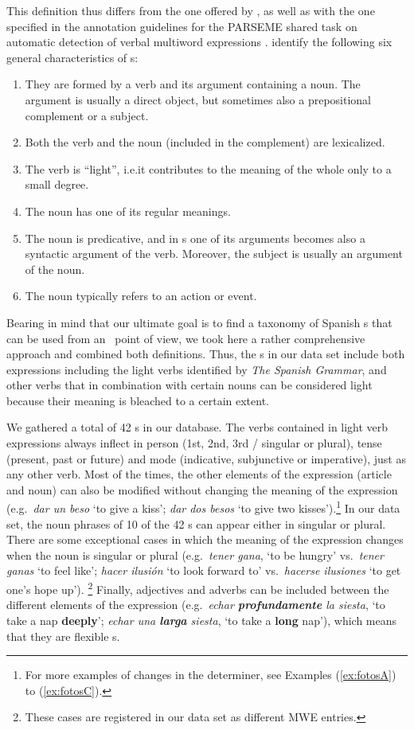 \documentclass[output=paper]{langsci/langscibook}
\begin{document}
This definition thus differs from the one offered by 
, as well as with the one specified in the annotation guidelines for the PARSEME shared task on automatic detection of verbal multiword expressions \citep{Vincze:2016}.
\cite{Vincze:2016} identify the following six general characteristics of \lvc s:

\begin{enumerate}
\item They are formed by a verb and its argument containing a noun. The argument is usually a direct object, but sometimes also a prepositional complement or a subject.
\item Both the verb and the noun (included in the complement) are lexicalized.
\item The verb is ``light'', i.e.\@ it contributes to the meaning of the whole only to a small degree.
\item The noun has one of its regular meanings.
\item The noun is predicative, and in \lvc s one of its arguments becomes also a syntactic argument of the verb. Moreover, the subject is usually an argument of the noun.
\item The noun typically refers to an action or event.
\end{enumerate}

Bearing in mind that our ultimate goal is to find a taxonomy of Spanish \mwe s that can be used from an \nlp\ point of view, we took here a rather comprehensive approach and combined both definitions.
Thus, the \lvc s in our data set include both expressions including the light verbs identified by \textit{The Spanish Grammar}, and other verbs that in combination with certain nouns can be considered light because their meaning is bleached to a certain extent.

We gathered a total of 42 \lvc s in our database.
 The verbs contained in light verb expressions always inflect in person (1st, 2nd, 3rd / singular or plural), tense (present, past or future) and mode (indicative, subjunctive or imperative), just as any other verb.
Most of the times, the other elements of the expression (article and noun) can also be modified without changing the meaning of the expression (e.g.\ \textit{dar un beso} `to give a kiss'; \textit{dar dos besos} `to give two kisses').\footnote{For more examples of changes in the determiner, see Examples (\ref{ex:fotosA}) to (\ref{ex:fotosC}).}
In our data set, the noun phrases of 10 of the 42 \lvc s can appear either in singular or plural.
There are some exceptional cases in which the meaning of the expression changes when the noun is singular or plural (e.g.\ \textit{tener gana}, `to be hungry' vs.\ \textit{tener ganas} `to feel like'; \textit{hacer ilusión} `to look forward to' vs.\ \textit{hacerse ilusiones} `to get one's hope up').%
\footnote{These cases are registered in our data set as different MWE entries.}
Finally, adjectives and adverbs can be included between the different elements of the expression (e.g.\ \textit{echar \textbf{profundamente} la siesta}, `to take a nap \textbf{deeply}'; \textit{echar una \textbf{larga} siesta}, `to take a \textbf{long} nap'), which means that they are flexible \mwe s.
\end{document}
